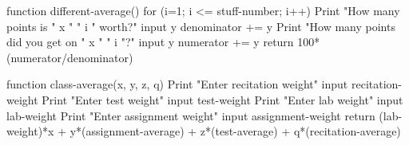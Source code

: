 \documentclass{article}
\begin{document}
function different-average()
   for (i=1; i <= stuff-number; i++)
      Print "How many points is " x " " i " worth?"
      input y
      denominator += y
      Print "How many points did you get on " x " " i "?"
      input y
      numerator += y
   return 100*(numerator/denominator)


function class-average(x, y, z, q)
   Print "Enter recitation weight"
   input recitation-weight
   Print "Enter test weight"
   input test-weight
   Print "Enter lab weight"
   input lab-weight
   Print "Enter assignment weight"
   input assignment-weight
   return (lab-weight)*x + y*(assignment-average) + z*(test-average) + q*(recitation-average)




   
\end{document}
